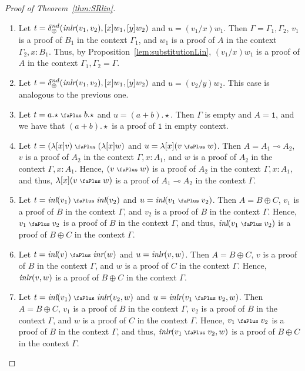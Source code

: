 \documentclass[screen, sigconf,authorversion,nonacm]{acmart}
\theoremstyle{acmdefinition}
\numberwithin{equation}{section}
\newcommand\abstr[1]{[#1]}
\newcommand\inl{\mbox{\it inl}}
\newcommand\inr{\mbox{\it inr}}
\newcommand\inlr{\mbox{\it inlr}}
\newcommand\plus{\mathrel{\text{\normalfont\scalebox{0.7}{\faPlus}}}}
\newcommand\one{\ensuremath{\mathtt 1}}
\newcommand\elimplus{\delta_{\oplus}}
\begin{document}
\begin{proof}[Proof of Theorem~\ref{thm:SRlin}]
\begin{enumerate}
		\item Let $t=\elimplus^{nd}(\inlr(v_1,v_2),\abstr{x}w_1,\abstr{y}w_2)$ and $u=(v_1/x)w_1$.
     Then $\Gamma=\Gamma_1,\Gamma_2$, $v_1$ is a proof of $B_1$ in the context $\Gamma_1$, and $w_1$ is a proof of $A$ in the context $\Gamma_2,x:B_1$. Thus, by Proposition~\ref{lem:substitutionLin}, $(v_1/x)w_1$ is a proof of $A$ in the context $\Gamma_1,\Gamma_2=\Gamma$.

		\item Let $t=\elimplus^{nd}(\inlr(v_1,v_2),\abstr{x}w_1,\abstr{y}w_2)$ and $u=(v_2/y)w_2$. This case is analogous to the previous one.

		\item Let $t={a.\star} \plus b.\star$ and $u=(a+b).\star$. Then $\Gamma$ is empty and $A=\one$, and we have that $(a+b).\star$ is a proof of $\one$ in empty context.

		\item Let $t=(\lambda \abstr{x}v) \plus (\lambda \abstr{x}w)$ and $u=\lambda \abstr{x}(v \plus w)$. Then $A=A_1\multimap A_2$, $v$ is a proof of $A_2$ in the context $\Gamma,x:A_1$, and $w$ is a proof of $A_2$ in the context $\Gamma,x:A_1$. Hence, $(v \plus w)$ is a proof of $A_2$ in the context $\Gamma,x:A_1$, and thus, $\lambda \abstr{x}(v \plus w)$ is a proof of $A_1\multimap A_2$ in the context $\Gamma$.

		\item\label{caseinlinl} Let $t=\inl(v_1) \plus \inl(v_2)$ and $u=\inl(v_1 \plus v_2)$. Then $A=B\oplus C$, $v_1$ is a proof of $B$ in the context $\Gamma$, and $v_2$ is a proof of $B$ in the context $\Gamma$. Hence, $v_1 \plus v_2$ is a proof of $B$ in the context $\Gamma$, and thus, $\inl(v_1 \plus v_2)$ is a proof of $B\oplus C$ in the context $\Gamma$.

		\item Let $t=\inl(v) \plus \inr(w)$ and $u=\inlr(v,w)$. Then $A=B\oplus C$, $v$ is a proof of $B$ in the context $\Gamma$, and $w$ is a proof of $C$ in the context $\Gamma$. Hence, $\inlr(v,w)$ is a proof of $B\oplus C$ in the context $\Gamma$.

		\item\label{caseinlinlr} Let $t=\inl(v_1) \plus \inlr(v_2,w)$ and $u=\inlr(v_1 \plus v_2,w)$. Then $A=B\oplus C$, $v_1$ is a proof of $B$ in the context $\Gamma$, $v_2$ is a proof of $B$ in the context $\Gamma$, and $w$ is a proof of $C$ in the context $\Gamma$. Hence, $v_1 \plus v_2$ is a proof of $B$ in the context $\Gamma$, and thus, $\inlr(v_1 \plus v_2,w)$ is a proof of $B\oplus C$ in the context $\Gamma$.


\end{enumerate}
\end{proof}
\end{document}
